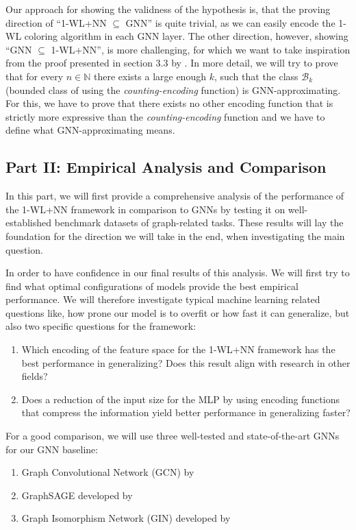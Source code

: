 \documentclass[11pt, dvipsnames, DIV=12]{scrreprt}
\theoremstyle{definition}
\newcommand{\Nb}{\mathbb{N}}
\newcommand{\wlnn}{\text{1-WL+NN }}
\begin{document}
Our approach for showing the validness of the hypothesis is, that the proving direction of ``1-WL+NN $\subseteq$ GNN'' is quite trivial, as we can easily encode the 1-WL coloring algorithm in each GNN layer. The other direction, however, showing ``GNN $\subseteq$ 1-WL+NN'', is more challenging, for which we want to take inspiration from the proof presented in section 3.3 by \cite{Chen2019}. In more detail, we will try to prove that for every $n \in \Nb$ there exists a large enough $k$, such that the class $\mathcal{B}_{k}$ (bounded class of \wlnn using the \emph{counting-encoding} function) is GNN-approximating. For this, we have to prove that there exists no other encoding function that is strictly more expressive than the \emph{counting-encoding} function and we have to define what GNN-approximating means.

\subsection{Part II: Empirical Analysis and Comparison}
In this part, we will first provide a comprehensive analysis of the performance of the 1-WL+NN framework in comparison to GNNs by testing it on well-established benchmark datasets of graph-related tasks. These results will lay the foundation for the direction we will take in the end, when investigating the main question.

In order to have confidence in our final results of this analysis. We will first try to find what optimal configurations of \wlnn models provide the best empirical performance. We will therefore investigate typical machine learning related questions like, how prone our model is to overfit or how fast it can generalize, but also two specific questions for the framework:
\begin{enumerate}[label=Q\arabic*)]
    \item Which encoding of the feature space for the 1-WL+NN framework has the best performance in generalizing? Does this result align with research in other fields?
    \item Does a reduction of the input size for the MLP by using encoding functions that compress the information yield better performance in generalizing faster?
\end{enumerate}
For a good comparison, we will use three well-tested and state-of-the-art GNNs for our GNN baseline:
\begin{enumerate}
    \item Graph Convolutional Network (GCN) by \cite{Kip+2017}
    \item GraphSAGE developed by \cite{Ham+2017}
    \item Graph Isomorphism Network (GIN) developed by \cite{Xu2018}
\end{enumerate}
\end{document}
